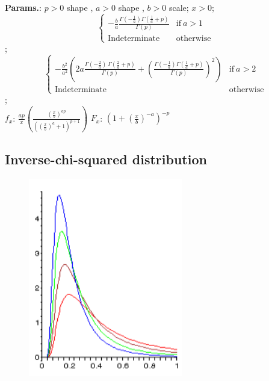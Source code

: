     {\color{darkblue} \textbf{Params.}:} {$p>0$ shape  ,  $a>0$ shape ,  $b > 0$ scale}; {$x>0$}; {$$\begin{cases}
              -\frac{b}{a}\frac{\Gamma\left(-\tfrac{1}{a}\right)\Gamma\left(\tfrac{1}{a}+p\right)}{\Gamma(p)} & \text{if}\ a>1    \\
              \text{Indeterminate} & \text{otherwise}\ \end{cases}$$}; {$$\begin{cases}
              -\frac{b^2}{a^2} \left(2 a \frac{\Gamma\left(-\tfrac{2}{a}\right) \, \Gamma\left(\tfrac{2}{a} + p\right)}{\Gamma\left(p\right)} + \left( \frac{\Gamma\left(-\tfrac{1}{a}\right) \Gamma\left(\tfrac{1}{a} + p\right)}{\Gamma\left(p\right)} \right)^2\right) & \text{if}\ a>2    \\
              \text{Indeterminate} & \text{otherwise}\ \end{cases}$$};\hspace{0.5cm}\\{\color{darkblue} \textbf{$f_x$}:} {$ \frac{a p}{x} \left( \frac{(\tfrac{x}{b})^{a p}}{\left((\tfrac{x}{b})^a + 1 \right)^{p+1}} \right) $}{\color{darkblue} \textbf{$F_x$}:} {$ {\left( 1+{\left(\frac{x}{b}\right)}^{-a} \right)}^{-p} $}



    
        
\subsection{Inverse-chi-squared distribution}


    \begin{figure}[H]
        \centering
        \includegraphics[width=0.6\textwidth]{images/Inverse chi squared density.png}
        \caption{}
    \end{figure}




